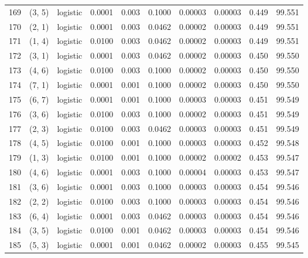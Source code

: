 \begin{tabular}{lllrrrrrrr}
169 &      (3, 5) &  logistic &  0.0001 &  0.003 &  0.1000 &          0.00003 &    0.00003 &       0.449 &    99.551 \\
170 &      (2, 1) &  logistic &  0.0001 &  0.003 &  0.0462 &          0.00002 &    0.00003 &       0.449 &    99.551 \\
171 &      (1, 4) &  logistic &  0.0100 &  0.003 &  0.0462 &          0.00002 &    0.00003 &       0.449 &    99.551 \\
172 &      (3, 1) &  logistic &  0.0001 &  0.003 &  0.0462 &          0.00002 &    0.00003 &       0.450 &    99.550 \\
173 &      (4, 6) &  logistic &  0.0100 &  0.003 &  0.1000 &          0.00002 &    0.00003 &       0.450 &    99.550 \\
174 &      (7, 1) &  logistic &  0.0001 &  0.001 &  0.1000 &          0.00002 &    0.00003 &       0.450 &    99.550 \\
175 &      (6, 7) &  logistic &  0.0001 &  0.001 &  0.1000 &          0.00003 &    0.00003 &       0.451 &    99.549 \\
176 &      (3, 6) &  logistic &  0.0100 &  0.003 &  0.1000 &          0.00002 &    0.00003 &       0.451 &    99.549 \\
177 &      (2, 3) &  logistic &  0.0100 &  0.003 &  0.0462 &          0.00003 &    0.00003 &       0.451 &    99.549 \\
178 &      (4, 5) &  logistic &  0.0100 &  0.001 &  0.1000 &          0.00003 &    0.00003 &       0.452 &    99.548 \\
179 &      (1, 3) &  logistic &  0.0100 &  0.001 &  0.1000 &          0.00002 &    0.00002 &       0.453 &    99.547 \\
180 &      (4, 6) &  logistic &  0.0001 &  0.003 &  0.1000 &          0.00004 &    0.00003 &       0.453 &    99.547 \\
181 &      (3, 6) &  logistic &  0.0001 &  0.003 &  0.1000 &          0.00003 &    0.00003 &       0.454 &    99.546 \\
182 &      (2, 2) &  logistic &  0.0100 &  0.003 &  0.1000 &          0.00003 &    0.00003 &       0.454 &    99.546 \\
183 &      (6, 4) &  logistic &  0.0001 &  0.003 &  0.0462 &          0.00003 &    0.00003 &       0.454 &    99.546 \\
184 &      (3, 5) &  logistic &  0.0100 &  0.001 &  0.0462 &          0.00003 &    0.00003 &       0.454 &    99.546 \\
185 &      (5, 3) &  logistic &  0.0001 &  0.001 &  0.0462 &          0.00002 &    0.00003 &       0.455 &    99.545 \\

\end{tabular}
